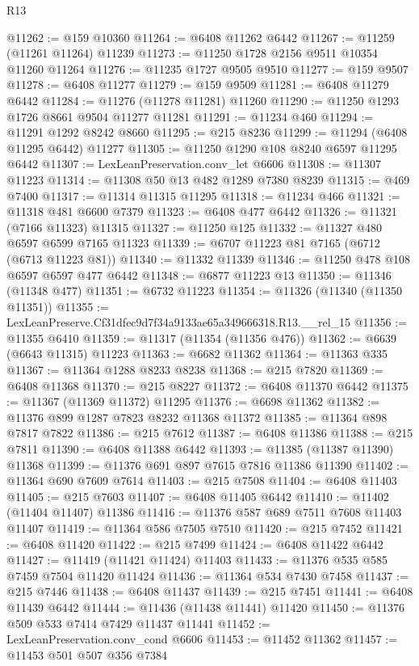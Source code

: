 \begin{lexlean}{R13}
\begin{coremodule}
@11262 := @159 @10360
@11264 := @6408 @11262 @6442
@11267 := @11259 (@11261 @11264) @11239
@11273 := @11250 @1728 @2156 @9511 @10354 @11260 @11264
@11276 := @11235 @1727 @9505 @9510
@11277 := @159 @9507
@11278 := @6408 @11277
@11279 := @159 @9509
@11281 := @6408 @11279 @6442
@11284 := @11276 (@11278 @11281) @11260
@11290 := @11250 @1293 @1726 @8661 @9504 @11277 @11281
@11291 := @11234 @460
@11294 := @11291 @1292 @8242 @8660
@11295 := @215 @8236
@11299 := @11294 (@6408 @11295 @6442) @11277
@11305 := @11250 @1290 @108 @8240 @6597 @11295 @6442
@11307 := LexLeanPreservation.conv_let @6606
@11308 := @11307 @11223
@11314 := @11308 @50 @13 @482 @1289 @7380 @8239
@11315 := @469 @7400
@11317 := @11314 @11315 @11295
@11318 := @11234 @466
@11321 := @11318 @481 @6600 @7379
@11323 := @6408 @477 @6442
@11326 := @11321 (@7166 @11323) @11315
@11327 := @11250 @125
@11332 := @11327 @480 @6597 @6599 @7165 @11323
@11339 := @6707 @11223 @81 @7165 (@6712 (@6713 @11223 @81))
@11340 := @11332 @11339
@11346 := @11250 @478 @108 @6597 @6597 @477 @6442
@11348 := @6877 @11223 @13
@11350 := @11346 (@11348 @477)
@11351 := @6732 @11223
@11354 := @11326 (@11340 (@11350 @11351))
@11355 := LexLeanPreserve.Cf31dfec9d7f34a9133ae65a349666318.R13.__rel_15
@11356 := @11355 @6410
@11359 := @11317 (@11354 (@11356 @476))
@11362 := @6639 (@6643 @11315) @11223
@11363 := @6682 @11362
@11364 := @11363 @335
@11367 := @11364 @1288 @8233 @8238
@11368 := @215 @7820
@11369 := @6408 @11368
@11370 := @215 @8227
@11372 := @6408 @11370 @6442
@11375 := @11367 (@11369 @11372) @11295
@11376 := @6698 @11362
@11382 := @11376 @899 @1287 @7823 @8232 @11368 @11372
@11385 := @11364 @898 @7817 @7822
@11386 := @215 @7612
@11387 := @6408 @11386
@11388 := @215 @7811
@11390 := @6408 @11388 @6442
@11393 := @11385 (@11387 @11390) @11368
@11399 := @11376 @691 @897 @7615 @7816 @11386 @11390
@11402 := @11364 @690 @7609 @7614
@11403 := @215 @7508
@11404 := @6408 @11403
@11405 := @215 @7603
@11407 := @6408 @11405 @6442
@11410 := @11402 (@11404 @11407) @11386
@11416 := @11376 @587 @689 @7511 @7608 @11403 @11407
@11419 := @11364 @586 @7505 @7510
@11420 := @215 @7452
@11421 := @6408 @11420
@11422 := @215 @7499
@11424 := @6408 @11422 @6442
@11427 := @11419 (@11421 @11424) @11403
@11433 := @11376 @535 @585 @7459 @7504 @11420 @11424
@11436 := @11364 @534 @7430 @7458
@11437 := @215 @7446
@11438 := @6408 @11437
@11439 := @215 @7451
@11441 := @6408 @11439 @6442
@11444 := @11436 (@11438 @11441) @11420
@11450 := @11376 @509 @533 @7414 @7429 @11437 @11441
@11452 := LexLeanPreservation.conv_cond @6606
@11453 := @11452 @11362
@11457 := @11453 @501 @507 @356 @7384

\end{coremodule}
\end{lexlean}
